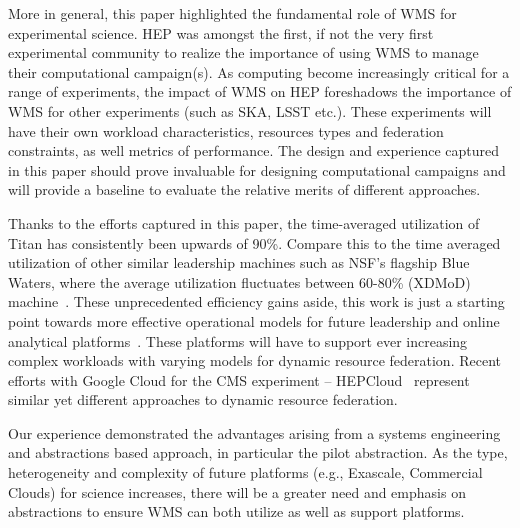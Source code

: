 More in general, this paper highlighted the fundamental role of WMS for
experimental science. HEP was amongst the first, if not the very first
experimental community to realize the importance of using WMS to manage their
computational campaign(s). As computing become increasingly critical for a range
of experiments, the impact of WMS on HEP foreshadows the importance of WMS for
other experiments (such as SKA, LSST etc.). %
These experiments will have their own workload characteristics, resources types
and federation constraints, as well metrics of performance.  The design and
experience captured in this paper should prove invaluable for designing
computational campaigns and will provide a baseline to evaluate the relative
merits of different approaches.

Thanks to the efforts captured in this paper, the time-averaged utilization of
Titan has consistently been upwards of 90\%. Compare this to the time averaged
utilization of other similar leadership machines such as NSF's flagship Blue
Waters, where the average utilization fluctuates between 60-80\% (XDMoD)
machine~\cite{bw-sucks}. These
unprecedented efficiency gains aside, this work is just a starting point towards
more effective operational models for future leadership and online analytical
platforms~\cite{foap-url}. These platforms will have to support ever increasing
complex workloads with varying models for dynamic resource federation. Recent
efforts with Google Cloud for the CMS experiment --
HEPCloud~\cite{hepcloud,google- hep} represent similar yet different approaches
to dynamic resource federation.

Our experience demonstrated the advantages arising from a  systems engineering
and abstractions based approach, in particular the pilot abstraction. As the
type, heterogeneity and complexity of future platforms  (e.g., Exascale,
Commercial Clouds) for science increases, there will be a greater need and
emphasis on abstractions to ensure WMS can both utilize as well as support
platforms.
